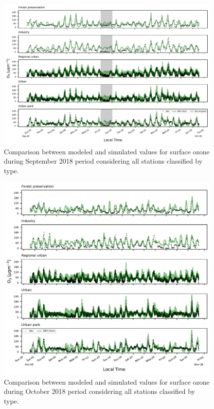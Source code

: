 \begin{figure}[!ht]
  \includegraphics[width=1\textwidth]{fig/Sep18_type_subplot_o3.pdf}
  \caption{Comparison between modeled and simulated values for surface ozone during September 2018 period considering all stations classified by type.}
  \label{fig:Sep18_type_o3}
\end{figure}

\begin{figure}[!ht]
  \includegraphics[width=1\textwidth]{fig/Oct18_type_subplot_o3.pdf}
  \caption{Comparison between modeled and simulated values for surface ozone during October 2018 period considering all stations classified by type.}
  \label{fig:Oct18_type_o3}
\end{figure}

